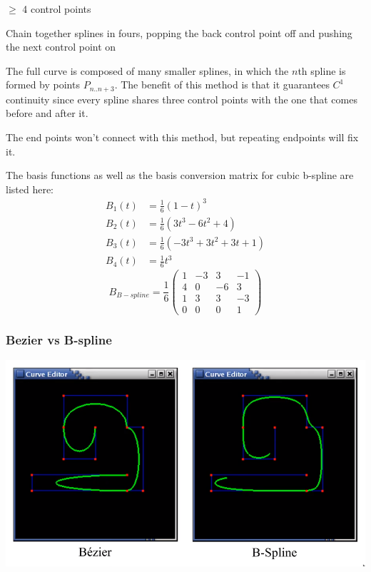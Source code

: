 \documentclass[12pt]{article}
\begin{document}
$\ge$ 4 control points

Chain together splines in fours, popping the back control point off and
pushing the next control point on


The full curve is composed of many smaller splines, in which the
$n$th spline is formed by points $P_{n..n+3}$. The benefit of this
method is that it guarantees $C^1$ continuity since every spline shares
three control points with the one that comes before and after it.

The end points won't connect with this method, but repeating endpoints
will fix it.

The basis functions as well as the basis conversion matrix
for cubic b-spline are listed here:
\begin{align*}
    B_1(t) &= \frac 1 6 (1-t)^3\\
    B_2(t) &= \frac 1 6 (3t^3-6t^2+4)\\
    B_3(t) &= \frac 1 6 (-3t^3+3t^2+3t+1)\\
    B_4(t) &= \frac 1 6 t^3
\end{align*}
\[
    B_{B-spline} =
    \frac 1 6
    \begin{pmatrix}
        1 & -3 & 3 & -1\\
        4 & 0 & -6 & 3\\
        1 & 3 & 3 & -3\\
        0 & 0 & 0 & 1
    \end{pmatrix}
\]

\subsubsection{Bezier vs B-spline}

\includegraphics[scale=.5]{images/bezier-vs-bspline.png}
\end{document}
